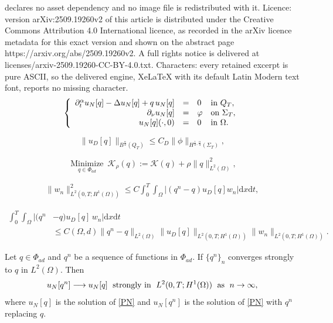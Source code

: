 \documentclass[10pt,a4paper]{amsart}
\newcommand{\dt} {\displaystyle\mathrm{d}t}
\newcommand{\dx} {\displaystyle\mathrm{d}x}
\begin{document}
declares no asset dependency and no image file is redistributed with it. Licence: version arXiv:2509.19260v2 of this article is distributed under the Creative Commons Attribution 4.0 International licence, as recorded in the arXiv licence metadata for this exact version and shown on the abstract page https://arxiv.org/abs/2509.19260v2. A full rights notice is delivered at licenses/arxiv-2509.19260-CC-BY-4.0.txt. Characters: every retained excerpt is pure ASCII, so the delivered engine, XeLaTeX with its default Latin Modern text font, reports no missing character.
\begin{eqnarray} \label{PN}
\left\{
  \begin{array}{rcll}
    \partial_{t} ^{\alpha}  u_N[q]-\Delta  u_N[q] +q\, u_N[q]&=&0&\hbox{in}\ Q_T, \\
    \displaystyle \partial_\nu u_N[q]&=&\varphi &\hbox{on}\  \Sigma_T, \\
   u_N[q](\cdot,0)&=&0  &\hbox{in}\ \Omega.
  \end{array}
\right.
\end{eqnarray}

\begin{equation} \label{estimate-Direchlet}
    \| u_D[q] \|_{B^{\frac{\alpha}{2}}(Q_T)} \leq C_D \|\phi\|_{H^{\frac{1}{2}, \frac{\alpha}{4}}(\Sigma_T)},
\end{equation}

\begin{equation}\label{stable} 
    \displaystyle\operatorname*{Minimize}_{q\in\Phi_{ad}}\
\mathcal{K}_\rho( q):=\mathcal{K}( q)+\rho\|q\|^2_{L^2(\Omega)},
\end{equation}

\begin{align} \label{h1+}
    \|w_n\|^2_{L^2(0,T;H^1(\Omega))} \leq C \int_0^T\int_{\Omega}\Big|(q^n -q) u_D[q]w_n\Big| \dx \dt,
\end{align}

\begin{align} \label{h11}
\int_0^T\int_\Omega\Big|(q^n &-q) u_D[q]\, w_n\Big|\dx\dt\nonumber\\&\leq C(\Omega,d)
\|q^n -q\|_{L^2(\Omega)}\| u_D[q]\|_{L^2(0,T;H^1(\Omega))}\|w_n\|_{L^2(0,T;H^1(\Omega))}.
\end{align}

\begin{lemma} \label{conv_N}
Let $q\in\Phi_{ad}$ and $q^n$ be a sequence of functions in $\Phi_{ad}.$ If $\{ q^n \}_n$ converges strongly to  $q$ in $L^2(\Omega)$. Then
\begin{equation} \label{convergancefaible-N}
    u_N[q^n]\longrightarrow u_N[q]\; \hbox{ strongly in }\; L^2(0,T;H^1(\Omega))\; \hbox{ as }\; n\to\infty, 
\end{equation}
where $u_N[q]$ is the solution of \eqref{PN} and $u_N[q^n]$ is the solution of \eqref{PN} with $q^n$ replacing $q$.
\end{lemma}
\end{document}
